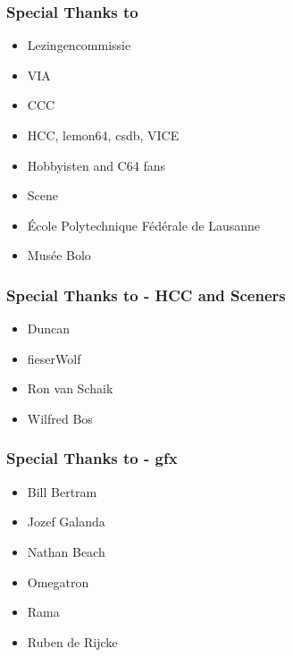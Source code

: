\begin{frame}
\frametitle{Special Thanks to}

\begin{itemize}
\item Lezingencommissie
\item VIA
\item CCC
\item HCC, lemon64, csdb, VICE
\item Hobbyisten and C64 fans
\item Scene
\item \'Ecole Polytechnique F\'ed\'erale de Lausanne
\item Mus\'ee Bolo
\end{itemize}

\end{frame}


\begin{frame}
\frametitle{Special Thanks to - HCC and Sceners}

\begin{itemize}
\item Duncan
\item fieserWolf
\item Ron van Schaik
\item Wilfred Bos
\end{itemize}

\end{frame}


\begin{frame}
\frametitle{Special Thanks to - gfx}

\begin{itemize}
\item Bill Bertram
\item Jozef Galanda
\item Nathan Beach
\item Omegatron
\item Rama
\item Ruben de Rijcke
\end{itemize}

\end{frame}


